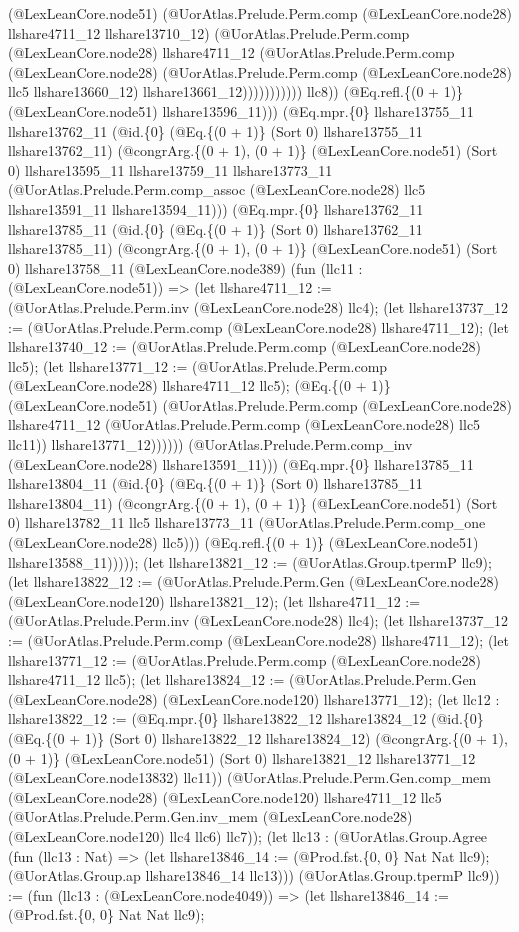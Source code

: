 \documentclass[11pt]{article}
\begin{document}
(@LexLeanCore.node51) (@UorAtlas.Prelude.Perm.comp (@LexLeanCore.node28) llshare4711\_12 llshare13710\_12) (@UorAtlas.Prelude.Perm.comp (@LexLeanCore.node28) llshare4711\_12 (@UorAtlas.Prelude.Perm.comp (@LexLeanCore.node28) (@UorAtlas.Prelude.Perm.comp (@LexLeanCore.node28) llc5 llshare13660\_12) llshare13661\_12))))))))))) llc8)) (@Eq.refl.\{(0 + 1)\} (@LexLeanCore.node51) llshare13596\_11))) (@Eq.mpr.\{0\} llshare13755\_11 llshare13762\_11 (@id.\{0\} (@Eq.\{(0 + 1)\} (Sort 0) llshare13755\_11 llshare13762\_11) (@congrArg.\{(0 + 1), (0 + 1)\} (@LexLeanCore.node51) (Sort 0) llshare13595\_11 llshare13759\_11 llshare13773\_11 (@UorAtlas.Prelude.Perm.comp\_assoc (@LexLeanCore.node28) llc5 llshare13591\_11 llshare13594\_11))) (@Eq.mpr.\{0\} llshare13762\_11 llshare13785\_11 (@id.\{0\} (@Eq.\{(0 + 1)\} (Sort 0) llshare13762\_11 llshare13785\_11) (@congrArg.\{(0 + 1), (0 + 1)\} (@LexLeanCore.node51) (Sort 0) llshare13758\_11 (@LexLeanCore.node389) (fun (llc11 : (@LexLeanCore.node51)) => (let llshare4711\_12 := (@UorAtlas.Prelude.Perm.inv (@LexLeanCore.node28) llc4); (let llshare13737\_12 := (@UorAtlas.Prelude.Perm.comp (@LexLeanCore.node28) llshare4711\_12); (let llshare13740\_12 := (@UorAtlas.Prelude.Perm.comp (@LexLeanCore.node28) llc5); (let llshare13771\_12 := (@UorAtlas.Prelude.Perm.comp (@LexLeanCore.node28) llshare4711\_12 llc5); (@Eq.\{(0 + 1)\} (@LexLeanCore.node51) (@UorAtlas.Prelude.Perm.comp (@LexLeanCore.node28) llshare4711\_12 (@UorAtlas.Prelude.Perm.comp (@LexLeanCore.node28) llc5 llc11)) llshare13771\_12)))))) (@UorAtlas.Prelude.Perm.comp\_inv (@LexLeanCore.node28) llshare13591\_11))) (@Eq.mpr.\{0\} llshare13785\_11 llshare13804\_11 (@id.\{0\} (@Eq.\{(0 + 1)\} (Sort 0) llshare13785\_11 llshare13804\_11) (@congrArg.\{(0 + 1), (0 + 1)\} (@LexLeanCore.node51) (Sort 0) llshare13782\_11 llc5 llshare13773\_11 (@UorAtlas.Prelude.Perm.comp\_one (@LexLeanCore.node28) llc5))) (@Eq.refl.\{(0 + 1)\} (@LexLeanCore.node51) llshare13588\_11))))); (let llshare13821\_12 := (@UorAtlas.Group.tpermP llc9); (let llshare13822\_12 := (@UorAtlas.Prelude.Perm.Gen (@LexLeanCore.node28) (@LexLeanCore.node120) llshare13821\_12); (let llshare4711\_12 := (@UorAtlas.Prelude.Perm.inv (@LexLeanCore.node28) llc4); (let llshare13737\_12 := (@UorAtlas.Prelude.Perm.comp (@LexLeanCore.node28) llshare4711\_12); (let llshare13771\_12 := (@UorAtlas.Prelude.Perm.comp (@LexLeanCore.node28) llshare4711\_12 llc5); (let llshare13824\_12 := (@UorAtlas.Prelude.Perm.Gen (@LexLeanCore.node28) (@LexLeanCore.node120) llshare13771\_12); (let llc12 : llshare13822\_12 := (@Eq.mpr.\{0\} llshare13822\_12 llshare13824\_12 (@id.\{0\} (@Eq.\{(0 + 1)\} (Sort 0) llshare13822\_12 llshare13824\_12) (@congrArg.\{(0 + 1), (0 + 1)\} (@LexLeanCore.node51) (Sort 0) llshare13821\_12 llshare13771\_12 (@LexLeanCore.node13832) llc11)) (@UorAtlas.Prelude.Perm.Gen.comp\_mem (@LexLeanCore.node28) (@LexLeanCore.node120) llshare4711\_12 llc5 (@UorAtlas.Prelude.Perm.Gen.inv\_mem (@LexLeanCore.node28) (@LexLeanCore.node120) llc4 llc6) llc7)); (let llc13 : (@UorAtlas.Group.Agree (fun (llc13 : Nat) => (let llshare13846\_14 := (@Prod.fst.\{0, 0\} Nat Nat llc9); (@UorAtlas.Group.ap llshare13846\_14 llc13))) (@UorAtlas.Group.tpermP llc9)) := (fun (llc13 : (@LexLeanCore.node4049)) => (let llshare13846\_14 := (@Prod.fst.\{0, 0\} Nat Nat llc9); 
\end{document}
